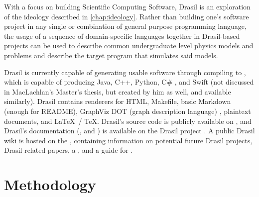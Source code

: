 With a focus on building Scientific Computing Software,
Drasil\thinspace\cite{Drasil2021} is an exploration of the ideology described in
\autoref{chap:ideology}. Rather than building one's software project in any
single or combination of general purpose programming language, the usage of a
sequence of domain-specific languages together in Drasil-based projects can be
used to describe common undergraduate level physics models and problems and
describe the target program that simulates said models.




\caseStudiesTable

Drasil is currently capable of generating usable software through compiling to
, which is capable of producing Java, C++, Python, C\#
\cite{MacLachlan2020}, and Swift (not discussed in MacLachlan's Master's thesis,
but created by him as well, and available similarly). Drasil contains renderers
for HTML, Makefile, basic Markdown (enough for README), GraphViz DOT (graph
description language) \cite{Gansner1993}, plaintext documents, and \LaTeX\ /
\TeX. Drasil's source code is publicly available on
, and Drasil's
documentation
(,
and
)
is available on the Drasil project
. A public Drasil
wiki is hosted on the , containing information
on potential future Drasil projects, Drasil-related papers, a
, and a
guide for .

\section{Methodology}

